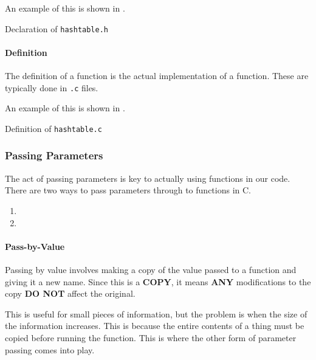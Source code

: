 An example of this is shown in .

\begin{listing}[h!tbp]
\caption{Declaration of \texttt{hashtable.h}}
\label{lst:Function_Declaration_hashtable}
\end{listing}

\paragraph{Definition}\label{par:Function_Definition}
The definition of a function is the actual implementation of a function.
These are typically done in \texttt{.c} files.

An example of this is shown in .

\begin{listing}[h!tbp]
\caption{Definition of \texttt{hashtable.c}}
\label{lst:Function_Definition_hashtable}
\end{listing}

\subsubsection{Passing Parameters}\label{subsubsec:Function_Passing_Parameters}
The act of passing parameters is key to actually using functions in our code.
There are two ways to pass parameters through to functions in C.

\begin{enumerate}[noitemsep]
\item {}
\item {}
\end{enumerate}

\paragraph{Pass-by-Value}\label{par:Pass_by_Value}
Passing by value involves making a copy of the value passed to a function and giving it a new name.
Since this is a \textbf{COPY}, it means \textbf{ANY} modifications to the copy \textbf{DO NOT} affect the original.

This is useful for small pieces of information, but the problem is when the size of the information increases.
This is because the entire contents of a thing must be copied before running the function.
This is where the other form of parameter passing comes into play.


